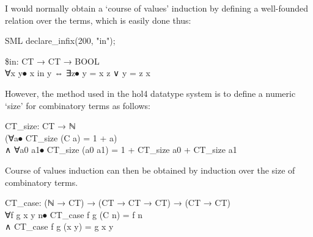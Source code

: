 I would normally obtain a `course of values' induction by defining a well-founded relation over the terms, which is easily done thus:

\begin{GFT}{SML}
\+declare\_infix(200, "in");\\
\end{GFT}

\begin{HOLConst}
\+\PrNM{} \$\PrNL{}in\PrNN{}: CT → CT → BOOL\\
\PrPH{}\PrPM{}\PrPM{}\PrPM{}\PrPM{}\PrPM{}\PrPM{}\PrPM{}\PrPM{}\PrPM{}\PrPM{}\PrPM{}
\+\PrNM{} ∀x y⦁ x in y ⇔ ∃z⦁ y = x  z ∨ y = z  x\\
\end{HOLConst}


\begin{GFT}{}
\end{GFT}


However, the method used in the hol4 datatype system is to define a numeric `size' for combinatory terms as follows:

\begin{HOLConst}
\+\PrNM{} \PrNL{}CT\_size\PrNN{}: CT → ℕ\\
\PrPH{}\PrPM{}\PrPM{}\PrPM{}\PrPM{}\PrPM{}\PrPM{}\PrPM{}\PrPM{}\PrPM{}\PrPM{}\PrPM{}
\+\PrNM{}	(∀a⦁		CT\_size (C a)		= 1 + a)\\
\+\PrNM{} ∧	∀a0 a1⦁	CT\_size (a0  a1)	= 1 + CT\_size a0 + CT\_size a1\\
\end{HOLConst}

Course of values induction can then be obtained by induction over the size of combinatory terms.

\begin{HOLConst}
\+\PrNM{} \PrNL{}CT\_case\PrNN{}: (ℕ → CT) → (CT → CT → CT) → (CT → CT)\\
\PrPH{}\PrPM{}\PrPM{}\PrPM{}\PrPM{}\PrPM{}\PrPM{}\PrPM{}\PrPM{}\PrPM{}\PrPM{}\PrPM{}
\+\PrNM{} ∀f g x y n⦁	CT\_case f g (C n) = f n\\
\+\PrNM{}		∧	CT\_case f g (x  y) = g x y\\
\end{HOLConst}

